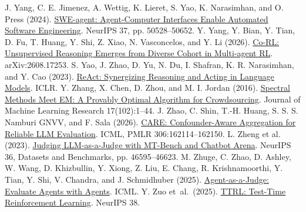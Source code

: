 \begin{thebibliography}{}
 J. Yang, C. E. Jimenez, A. Wettig, K. Lieret, S. Yao, K. Narasimhan, and O. Press (2024). \href{https://papers.neurips.cc/paper_files/paper/2024/hash/5a7c947568c1b1328ccc5230172e1e7c-Abstract-Conference.html}{SWE-agent: Agent-Computer Interfaces Enable Automated Software Engineering}. NeurIPS 37, pp. 50528--50652.
 Y. Yang, Y. Bian, Y. Tian, D. Fu, T. Huang, Y. Shi, Z. Xiao, N. Vasconcelos, and Y. Li (2026). \href{https://arxiv.org/abs/2608.17253}{Co-RL: Unsupervised Reasoning Emerges from Diverse Cohort in Multi-agent RL}. arXiv:2608.17253.
 S. Yao, J. Zhao, D. Yu, N. Du, I. Shafran, K. R. Narasimhan, and Y. Cao (2023). \href{https://openreview.net/forum?id=WE_vluYUL-X}{ReAct: Synergizing Reasoning and Acting in Language Models}. ICLR.
 Y. Zhang, X. Chen, D. Zhou, and M. I. Jordan (2016). \href{https://jmlr.org/papers/v17/14-511.html}{Spectral Methods Meet EM: A Provably Optimal Algorithm for Crowdsourcing}. Journal of Machine Learning Research 17(102):1--44.
 J. Zhao, C. Shin, T.-H. Huang, S. S. S. Namburi GNVV, and F. Sala (2026). \href{https://proceedings.mlr.press/v306/zhao26aq.html}{CARE: Confounder-Aware Aggregation for Reliable LLM Evaluation}. ICML, PMLR 306:162114--162150.
 L. Zheng et al. (2023). \href{https://proceedings.neurips.cc/paper_files/paper/2023/hash/91f18a1287b398d378ef22505bf41832-Abstract.html}{Judging LLM-as-a-Judge with MT-Bench and Chatbot Arena}. NeurIPS 36, Datasets and Benchmarks, pp. 46595--46623.
 M. Zhuge, C. Zhao, D. Ashley, W. Wang, D. Khizbullin, Y. Xiong, Z. Liu, E. Chang, R. Krishnamoorthi, Y. Tian, Y. Shi, V. Chandra, and J. Schmidhuber (2025). \href{https://arxiv.org/abs/2410.10934}{Agent-as-a-Judge: Evaluate Agents with Agents}. ICML.
 Y. Zuo et~al.\ (2025). \href{https://openreview.net/forum?id=VuVhgEiu20}{TTRL: Test-Time Reinforcement Learning}. NeurIPS 38.
\end{thebibliography}
